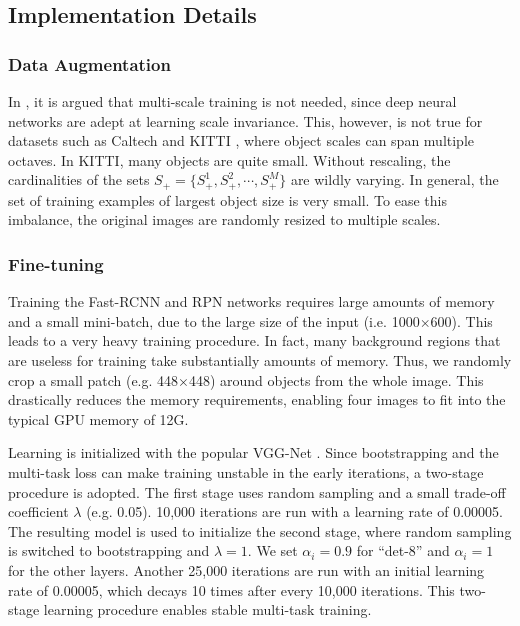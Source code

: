 \documentclass[runningheads]{llncs}
\begin{document}
\subsection{Implementation Details}
\label{subsec:rpn details}

\subsubsection{Data Augmentation}
In \cite{DBLP:conf/iccv/Girshick15,DBLP:conf/eccv/HeZR014}, it is argued
that multi-scale training is not needed, since deep neural networks are
adept at learning scale invariance. This, however, is not true for datasets
such as Caltech \cite{DBLP:journals/pami/DollarWSP12} and
KITTI \cite{DBLP:conf/cvpr/GeigerLU12}, where object scales can span multiple
octaves. In KITTI, many objects are quite small. Without rescaling, the
cardinalities of the sets $S_+=\{S_+^1,S_+^2,\cdots,S_+^M\}$ are wildly
varying. In general, the set of training examples of largest object size
is very small. To ease this imbalance, the original images are randomly resized
to multiple scales.

\subsubsection{Fine-tuning}
Training the Fast-RCNN \cite{DBLP:conf/iccv/Girshick15} and RPN \cite{DBLP:conf/nips/shaoqing15fasterRcnn} networks requires large amounts of memory and a small mini-batch, due to the large size of the input (i.e. 1000$\times$600). This leads to a very heavy training procedure. In fact, many background regions that are useless for training take substantially amounts of memory. Thus, we randomly crop a small patch (e.g. 448$\times$448) around objects from the whole image. This drastically reduces the memory requirements, enabling four images to fit into the typical GPU memory of 12G.

Learning is initialized with the popular
VGG-Net \cite{DBLP:journals/corr/SimonyanZ14a}. Since bootstrapping
and the multi-task loss can make training unstable in the early iterations,
a two-stage procedure is adopted. The first stage uses random
sampling and a small trade-off coefficient $\lambda$ (e.g. 0.05).
10,000 iterations are run with a learning rate of 0.00005.
The resulting model is used to initialize the second stage,
where random sampling is switched to bootstrapping and
$\lambda=1$. We set $\alpha_i=0.9$ for ``det-8'' and $\alpha_i=1$ for the
other layers. Another 25,000 iterations are run with an initial learning rate of 0.00005, which decays 10 times after every 10,000 iterations. This two-stage learning procedure enables stable multi-task training.
\end{document}
